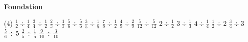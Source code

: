 \documentclass[17pt,a4paper,landscape]{extarticle}
\begin{document}
\sffamily
\boldmath

\boldmath

\vspace*{0.4em}
{\LARGE \textbf{Foundation}}
\begin{tasks}(4)
\task \mbox{$\frac{1}{2}\div\frac{1}{4}$}
\task \mbox{$\frac{3}{4}\div\frac{1}{2}$}
\task \mbox{$\frac{2}{3}\div\frac{1}{3}$}
\task \mbox{$\frac{5}{6}\div\frac{5}{6}$}
\task \mbox{$\frac{3}{5}\div\frac{1}{5}$}
\task \mbox{$\frac{7}{8}\div\frac{1}{2}$}
\task \mbox{$\frac{4}{9}\div\frac{2}{9}$}
\task \mbox{$\frac{5}{12}\div\frac{5}{12}$}
\task \mbox{$2\div\frac{1}{2}$}
\task \mbox{$3\div\frac{1}{3}$}
\task \mbox{$4\div\frac{1}{4}$}
\task \mbox{$\frac{1}{2}\div 2$}
\task \mbox{$\frac{3}{4}\div 3$}
\task \mbox{$\frac{5}{6}\div 5$}
\task \mbox{$\frac{2}{5}\div\frac{1}{5}$}
\task \mbox{$\frac{9}{10}\div\frac{3}{10}$}
\end{tasks}
\end{document}

